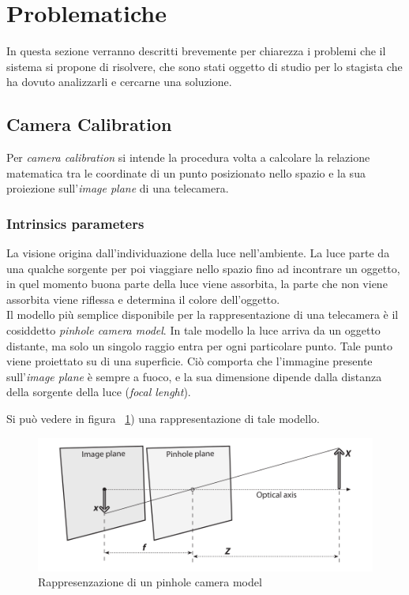 \section{Problematiche} \label{sec:prob}
In questa sezione verranno descritti brevemente per chiarezza i problemi che il sistema si propone di risolvere, che sono stati oggetto di studio per lo stagista che ha dovuto analizzarli e cercarne una soluzione.
\subsection{Camera Calibration} \label{sec:camcalib}
Per \textit{camera calibration} si intende la procedura volta a calcolare la relazione matematica tra le coordinate di un punto posizionato nello spazio e la sua proiezione sull'\textit{image plane} di una telecamera. \\

\subsubsection{Intrinsics parameters}
La visione origina dall'individuazione della luce nell'ambiente. La luce parte da una qualche sorgente per poi viaggiare nello spazio fino ad incontrare un oggetto, in quel momento buona parte della luce viene assorbita, la parte che non viene assorbita viene riflessa e determina il colore dell'oggetto. \\

Il modello più semplice disponibile per la rappresentazione di una telecamera è il cosiddetto \textit{pinhole camera model}. In tale modello la luce arriva da un oggetto distante, ma solo un singolo raggio entra per ogni particolare punto. Tale punto viene proiettato su di una superficie. Ciò comporta che l'immagine presente sull'\textit{image plane} è sempre a fuoco, e la sua dimensione dipende dalla distanza della sorgente della luce (\textit{focal lenght}).

Si può vedere in figura ~\ref{fig:calib1}) una rappresentazione di tale modello.
\begin{figure}[htpb] 
\centering 
\includegraphics[scale=0.4]{./images/calib1.png} 
\caption{Rappresenzazione di un pinhole camera model} 
\label{fig:calib1}
\end{figure} 


